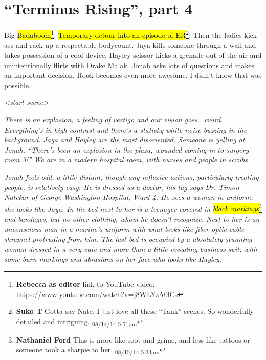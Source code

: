 \setcounter{chapter}{ 29 }
\chapter{\textbf{``Terminus Rising'', part 4} }






Big \hl{Badaboom}\footnote{\textbf{Rebecca as editor} link to YouTube video: https://www.youtube.com/watch?v=j8WLYzA0lCs}.  \hl{Temporary detour into an episode of ER}\footnote{\textbf{Suko T }Gotta say Nate, I just love all these ``Tank'' scenes.  So wonderfully detailed and intriguing. \textsubscript{08/14/14 5:51pm}}.  Then the ladies kick ass and rack up a respectable bodycount.   Jaya kills someone through a wall and takes possession of a cool device.  Hayley scissor kicks a grenade out of the air and unintentionally flirts with Drake Malak.  Jonah asks lots of questions and makes an important decision.  Rook becomes even more awesome.  I didn't know that was possible.







\textit{\textless start scene\textgreater }



\textit{There is an explosion, a feeling of vertigo and our vision goes...weird.  Everything's in high contrast and there's a staticky white noise buzzing in the background.  Jaya and Hayley are the most disoriented.  Someone is yelling at Jonah.  ``There's been an explosion in the plaza, wounded coming in to surgery room 3!''  We are in a modern hospital room, with nurses and people in scrubs.}



\textit{Jonah feels odd, a little distant, though any reflexive actions, particularly treating people, is relatively easy.  He is dressed as a doctor, his tag says Dr. Timon Natekar of George Washington Hospital, Ward 4.  He sees a woman in uniform, she looks like Jaya.  In the bed next to her is a teenager covered in }\textit{\hl{black markings}}\footnote{\textbf{Nathaniel Ford }This is more like soot and grime, and less like tattoos or someone took a sharpie to her. \textsubscript{08/15/14 5:23am}}\textit{ and bandages, but no other clothing, whom he doesn't recognize.  Next to her is an unconscious man in a marine's uniform with what looks like fiber optic cable shrapnel protruding from him.  The last bed is occupied by a absolutely stunning woman dressed in a very cute and more-than-a-little revealing business suit, with some burn markings and abrasions on her face who looks like Hayley.}



